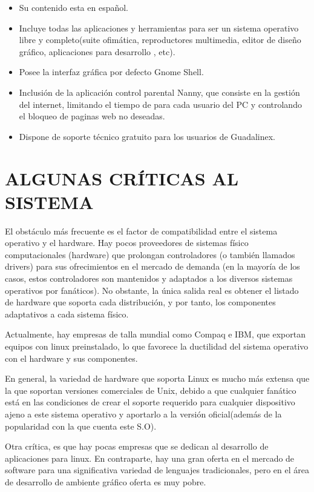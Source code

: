 \begin{itemize}
  \item Su contenido esta en español.
  \item Incluye todas las aplicaciones y herramientas para ser un sistema operativo libre y completo(suite ofimática, reproductores multimedia, editor de diseño gráfico, aplicaciones para desarrollo , etc).
  \item Posee la interfaz gráfica por defecto Gnome Shell.
  \item Inclusión de la aplicación control parental Nanny, que consiste en la gestión del internet, limitando el tiempo de para cada usuario del PC y controlando el bloqueo de paginas web no deseadas.
  \item Dispone de soporte técnico gratuito para los usuarios de Guadalinex.
\end{itemize}

\section*{ALGUNAS CRÍTICAS AL SISTEMA}

El obstáculo más frecuente es el factor de compatibilidad entre
el sistema operativo y el hardware. Hay pocos proveedores de
sistemas físico computacionales (hardware) que prolongan
controladores (o también llamados drivers) para sus
ofrecimientos en el mercado de demanda (en la mayoría de los
casos, estos controladores son mantenidos y adaptados a los
diversos sistemas operativos por fanáticos). No obstante, la
única salida real es obtener el listado de hardware que soporta
cada distribución, y por tanto, los componentes adaptativos a
cada sistema físico.

Actualmente, hay empresas de talla mundial como Compaq e
IBM, que exportan equipos con linux preinstalado, lo que
favorece la ductilidad del sistema operativo con el hardware y
sus componentes.

En general, la variedad de hardware que soporta Linux es
mucho más extensa que la que soportan versiones comerciales
de Unix, debido a que cualquier fanático está en las condiciones
de crear el soporte requerido para cualquier dispositivo ajeno a
este sistema operativo y aportarlo a la versión oficial(además de
la popularidad con la que cuenta este S.O).

Otra crítica, es que hay pocas empresas que se dedican al
desarrollo de aplicaciones para linux. En contraparte, hay una
gran oferta en el mercado de software para una significativa
variedad de lenguajes tradicionales, pero en el área de
desarrollo de ambiente gráfico oferta es muy pobre.

